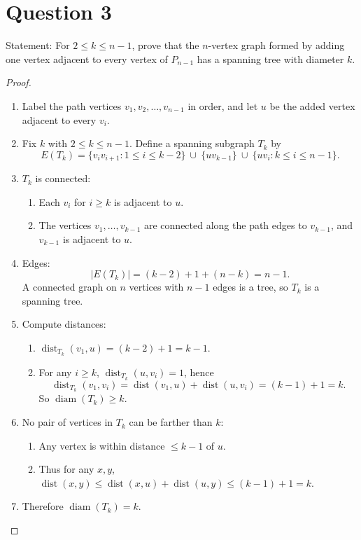 \documentclass[11pt]{article}
\newcommand{\diam}{\operatorname{diam}}
\newcommand{\dist}{\operatorname{dist}}
\begin{document}
\newpage

\section*{Question 3}
Statement: For $2\le k\le n-1$, prove that the $n$-vertex graph formed by adding one vertex adjacent to every vertex of $P_{n-1}$ has a spanning tree with diameter $k$.

\begin{proof}
~
\begin{enumerate}
\item Label the path vertices $v_1,v_2,\dots,v_{n-1}$ in order, and let $u$ be the added vertex adjacent to every $v_i$.
\item Fix $k$ with $2\le k\le n-1$. Define a spanning subgraph $T_k$ by
\[
E(T_k)=\{v_iv_{i+1}:1\le i\le k-2\}\ \cup\ \{uv_{k-1}\}\ \cup\ \{uv_i:k\le i\le n-1\}.
\]
\item $T_k$ is connected:
\begin{enumerate}
\item Each $v_i$ for $i\ge k$ is adjacent to $u$.
\item The vertices $v_1,\dots,v_{k-1}$ are connected along the path edges to $v_{k-1}$, and $v_{k-1}$ is adjacent to $u$.
\end{enumerate}
\item Edges:
\[
|E(T_k)|=(k-2)+1+(n-k)=n-1.
\]
A connected graph on $n$ vertices with $n-1$ edges is a tree, so $T_k$ is a spanning tree.
\item Compute distances:
\begin{enumerate}
\item $\dist_{T_k}(v_1,u)=(k-2)+1=k-1$.
\item For any $i\ge k$, $\dist_{T_k}(u,v_i)=1$, hence
\[
\dist_{T_k}(v_1,v_i)=\dist(v_1,u)+\dist(u,v_i)=(k-1)+1=k.
\]
So $\diam(T_k)\ge k$.
\end{enumerate}
\item No pair of vertices in $T_k$ can be farther than $k$:
\begin{enumerate}
\item Any vertex is within distance $\le k-1$ of $u$.
\item Thus for any $x,y$, $\dist(x,y)\le \dist(x,u)+\dist(u,y)\le (k-1)+1=k$.
\end{enumerate}
\item Therefore $\diam(T_k)=k$.
\end{enumerate}
\end{proof}
\end{document}
